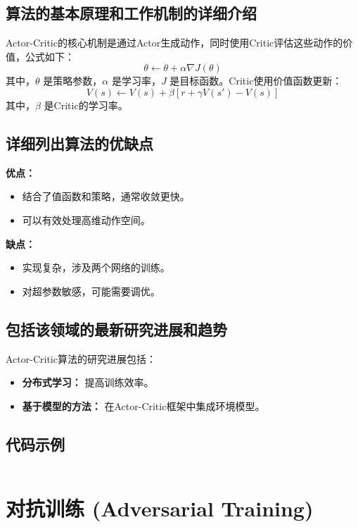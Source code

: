 \subsection*{算法的基本原理和工作机制的详细介绍}
Actor-Critic的核心机制是通过Actor生成动作，同时使用Critic评估这些动作的价值，公式如下：
\[
    \theta \leftarrow \theta + \alpha \nabla J(\theta)
\]
其中，\(\theta\) 是策略参数，\(\alpha\) 是学习率，\(J\) 是目标函数。Critic使用价值函数更新：
\[
    V(s) \leftarrow V(s) + \beta [r + \gamma V(s') - V(s)]
\]
其中，\(\beta\) 是Critic的学习率。

\subsection*{详细列出算法的优缺点}
\textbf{优点：}
\begin{itemize}
    \item 结合了值函数和策略，通常收敛更快。
    \item 可以有效处理高维动作空间。
\end{itemize}

\textbf{缺点：}
\begin{itemize}
    \item 实现复杂，涉及两个网络的训练。
    \item 对超参数敏感，可能需要调优。
\end{itemize}

\subsection*{包括该领域的最新研究进展和趋势}
Actor-Critic算法的研究进展包括：
\begin{itemize}
    \item \textbf{分布式学习：} 提高训练效率。
    \item \textbf{基于模型的方法：} 在Actor-Critic框架中集成环境模型。
\end{itemize}
\subsection*{代码示例}
\begin{lstlisting}

\end{lstlisting}


\section{对抗训练 (Adversarial Training)}
